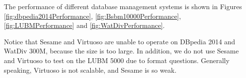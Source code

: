\documentclass[titlepage, a4paper, 12pt]{article}
\begin{document}

The performance of different database management systems is shown in Figures \ref{fig:dbpedia2014Performance}, \ref{fig:Bsbm10000Performance}, \ref{fig:LUBMPerformance} and \ref{fig:WatDivPerformance}.

Notice that Sesame and Virtuoso are unable to operate on DBpedia 2014 and
WatDiv 300M, because the size is too large. In addition, we do not use
Sesame and Virtuoso to test on the LUBM 5000 due to format questions. 
Generally speaking, Virtuoso is not scalable, and Sesame is so weak. \\
\end{document}
